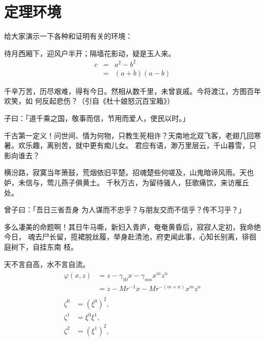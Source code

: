 \section{定理环境}
\label{sec:theorem}

给大家演示一下各种和证明有关的环境：

\begin{assumption}
待月西厢下，迎风户半开；隔墙花影动，疑是玉人来。
\begin{eqnarray}
  \label{eq:eqnxmp}
  c & = & a^2 - b^2\\
    & = & (a+b)(a-b)
\end{eqnarray}
\end{assumption}

千辛万苦，历尽艰难，得有今日。然相从数千里，未曾哀戚。今将渡江，方图百年欢笑，如
何反起悲伤？（引自《杜十娘怒沉百宝箱》）

\begin{definition}
子曰：「道千乘之国，敬事而信，节用而爱人，使民以时。」
\end{definition}

千古第一定义！问世间、情为何物，只教生死相许？天南地北双飞客，老翅几回寒暑。欢乐趣，离别苦，就中更有痴儿女。
君应有语，渺万里层云，千山暮雪，只影向谁去？

横汾路，寂寞当年箫鼓，荒烟依旧平楚。招魂楚些何嗟及，山鬼暗谛风雨。天也妒，未信与，莺儿燕子俱黄土。
千秋万古，为留待骚人，狂歌痛饮，来访雁丘处。

\begin{proposition}
 曾子曰：「吾日三省吾身 \pozhehao 为人谋而不忠乎？与朋友交而不信乎？传不习乎？」
\end{proposition}

多么凄美的命题啊！其日牛马嘶，新妇入青庐，奄奄黄昏后，寂寂人定初，我命绝今日，
魂去尸长留，揽裙脱丝履，举身赴清池，府吏闻此事，心知长别离，徘徊庭树下，自挂东南
枝。

\begin{remark}
天不言自高，水不言自流。
\begin{gather*}
\begin{split}
\varphi(x,z)
&=z-\gamma_{10}x-\gamma_{mn}x^mz^n\\
&=z-Mr^{-1}x-Mr^{-(m+n)}x^mz^n
\end{split}\\[6pt]
\begin{align} \zeta^0&=(\xi^0)^2,\\
\zeta^1 &=\xi^0\xi^1,\\
\zeta^2 &=(\xi^1)^2,
\end{align}
\end{gather*}
\end{remark}

